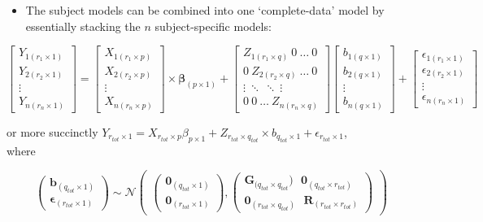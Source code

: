 \documentclass[
  9pt,
  ignorenonframetext,
]{beamer}
\providecommand{\tightlist}{%
  \setlength{\itemsep}{0pt}\setlength{\parskip}{0pt}}
\begin{document}
\begin{frame}{}
\protect\hypertarget{section-2}{}
\begin{itemize}
\tightlist
\item
  The subject models can be combined into one `complete-data' model by
  essentially stacking the \(n\) subject-specific models:
\end{itemize}

\[
\begin{bmatrix}
Y_{1 (r_1 \times 1)}\\Y_{2 (r_2 \times 1)}\\ \vdots\\ Y_{n (r_n \times 1)}
\end{bmatrix} =
\begin{bmatrix}
X_{1 (r_1 \times p)}\\X_{2(r_2 \times p)}\\ \vdots\\ X_{n(r_n \times p)}
\end{bmatrix}
\times \pmb \beta_{(p \times 1)} +
\begin{bmatrix}
Z_{1 (r_1 \times q)}\ 0\ \dots\ 0\\ 0\ Z_{2 (r_2 \times q)}\ \dots\ 0\\ \vdots\ \ddots\ \ddots\ \vdots\\ 0\ 0\ \dots\ Z_{n (r_n \times q)}
\end{bmatrix}
\begin{bmatrix}
b_{1 (q \times 1)}\\b_{2 (q \times 1)}\\ \vdots\\ b_{n (q \times 1)}
\end{bmatrix} +
\begin{bmatrix}
\epsilon_{1 (r_1 \times 1)}\\ \epsilon_{2 (r_2 \times 1)}\\ \vdots\\ \epsilon_{n (r_n \times 1)}
\end{bmatrix}
\]

or more succinctly
\(Y_{r_{tot} \times 1} = X_{r_{tot} \times p} \beta_{p \times 1} + Z_{r_{tot}\times q_{tot}} \times b_{q_{tot} \times 1} + \epsilon_{r_{tot} \times 1}\),\\
where

\[
\begin{pmatrix} \pmb b_{(q_{tot} \times 1)} \\ \pmb \epsilon_{(r_{tot} \times 1)}
\end{pmatrix}
\sim \mathcal N 
\begin{pmatrix}
\begin{pmatrix}
\pmb 0_{(q_{tot} \times 1)}\\ \pmb 0_{(r_{tot} \times 1)}
\end{pmatrix} ,
\begin{pmatrix}
\pmb G_{(q_{tot} \times q_{tot}})\ \ \ \pmb 0_{(q_{tot} \times r_{tot})}\\ \pmb 0_{(r_{tot} \times q_{tot})}\ \ \ \pmb R_{(r_{tot} \times r_{tot})}
\end{pmatrix}
\end{pmatrix}
\]


\end{frame}
\end{document}
